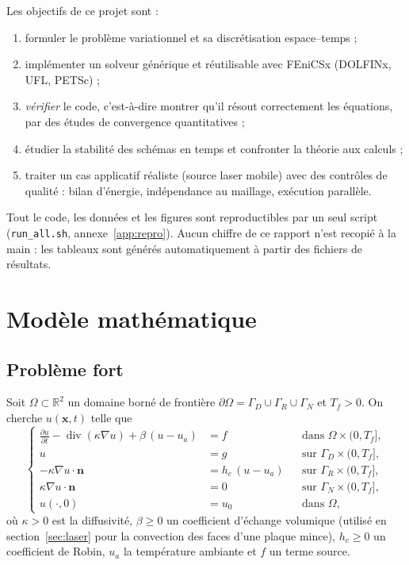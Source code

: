 \documentclass[11pt,a4paper]{article}
\newcommand{\R}{\mathbb{R}}
\DeclareMathOperator{\divg}{div}
\begin{document}
Les objectifs de ce projet sont :
\begin{enumerate}
  \item formuler le problème variationnel et sa discrétisation espace--temps ;
  \item implémenter un solveur générique et réutilisable avec FEniCSx (DOLFINx, UFL, PETSc) ;
  \item \emph{vérifier} le code, c'est-à-dire montrer qu'il résout correctement les équations, par des
        études de convergence quantitatives ;
  \item étudier la stabilité des schémas en temps et confronter la théorie aux calculs ;
  \item traiter un cas applicatif réaliste (source laser mobile) avec des contrôles de qualité :
        bilan d'énergie, indépendance au maillage, exécution parallèle.
\end{enumerate}

Tout le code, les données et les figures sont reproductibles par un seul script
(\texttt{run\_all.sh}, annexe~\ref{app:repro}). Aucun chiffre de ce rapport n'est recopié à la main :
les tableaux sont générés automatiquement à partir des fichiers de résultats.

\section{Modèle mathématique}
\subsection{Problème fort}
Soit $\Omega\subset\R^2$ un domaine borné de frontière $\partial\Omega = \Gamma_D \cup \Gamma_R \cup \Gamma_N$
et $T_f>0$. On cherche $u(\bm{x},t)$ telle que
\begin{equation}\label{eq:strong}
\left\{
\begin{aligned}
  \frac{\partial u}{\partial t} - \divg(\kappa \nabla u) + \beta\,(u - u_a) &= f
      && \text{dans } \Omega \times (0,T_f], \\
  u &= g && \text{sur } \Gamma_D \times (0,T_f], \\
  -\kappa \nabla u \cdot \bm{n} &= h_c\,(u - u_a) && \text{sur } \Gamma_R \times (0,T_f], \\
  \kappa \nabla u \cdot \bm{n} &= 0 && \text{sur } \Gamma_N \times (0,T_f], \\
  u(\cdot,0) &= u_0 && \text{dans } \Omega,
\end{aligned}
\right.
\end{equation}
où $\kappa>0$ est la diffusivité, $\beta\ge 0$ un coefficient d'échange volumique (utilisé en
section~\ref{sec:laser} pour la convection des faces d'une plaque mince), $h_c\ge0$ un coefficient de
Robin, $u_a$ la température ambiante et $f$ un terme source.
\end{document}
